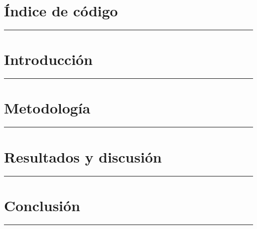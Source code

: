 \documentclass[a4paper,11pt]{article}
\begin{document}
\newpage
\thispagestyle{main}
\mbox{}
\newpage

\thispagestyle{main}
\renewcommand{\listtablename}{Índice de tablas}
\renewcommand{\cftafterlottitle}{%
  \par\nobreak
  {\color{tfgazul}\rule{\textwidth}{3pt}}%
  \par\nobreak
}
\listoftables
\thispagestyle{main}

\newpage
\thispagestyle{main}
\mbox{}
\newpage

\thispagestyle{main}
\renewcommand{\lstlistlistingname}{Índice de código}
\section*{\lstlistlistingname}
{\color{tfgazul}\rule{\textwidth}{3pt}}

\begingroup
\renewcommand{\lstlistlistingname}{}
\lstlistoflistings
\endgroup
\thispagestyle{main}

\newpage
\thispagestyle{main}
\mbox{}
\newpage

\section{Introducción}
{\color{tfgazul}\rule{\textwidth}{3pt}}


\newpage
\section{Metodología}
{\color{tfgazul}\rule{\textwidth}{3pt}}


\newpage
\section{Resultados y discusión}
{\color{tfgazul}\rule{\textwidth}{3pt}}


\newpage
\section{Conclusión}
{\color{tfgazul}\rule{\textwidth}{3pt}}

\end{document}
